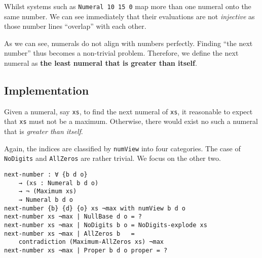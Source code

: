 \documentclass[\main/thesis.tex]{subfiles}
\begin{document}
Whilst systems such as {\lstinline|Numeral 10 15 0|} map more than one numeral
onto the same number. We can see immediately that their evaluations are not
\textit{injective} as those number lines ``overlap'' with each other.

\begin{center}
    \begin{adjustbox}{max width=\textwidth}
    \end{adjustbox}
\end{center}


As we can see, numerals do not align with numbers perfectly.
Finding ``the next number'' thus becomes a non-trivial problem.
Therefore, we define the next numeral as \textbf{the least numeral that is greater than itself}.

\subsection{Implementation}

Given a numeral, say {\lstinline|xs|}, to find the next numeral of {\lstinline|xs|},
it reasonable to expect that {\lstinline|xs|} must not be a maximum.
Otherwise, there would exist no such a numeral that is \textit{greater than itself}.

Again, the indices are classified by {\lstinline|numView|} into four categories.
The case of {\lstinline|NoDigits|} and {\lstinline|AllZeros|} are rather trivial.
We focus on the other two.

\begin{lstlisting}
next-number : ∀ {b d o}
    → (xs : Numeral b d o)
    → ¬ (Maximum xs)
    → Numeral b d o
next-number {b} {d} {o} xs ¬max with numView b d o
next-number xs ¬max | NullBase d o = ?
next-number xs ¬max | NoDigits b o = NoDigits-explode xs
next-number xs ¬max | AllZeros b   =
    contradiction (Maximum-AllZeros xs) ¬max
next-number xs ¬max | Proper b d o proper = ?
\end{lstlisting}
\end{document}
